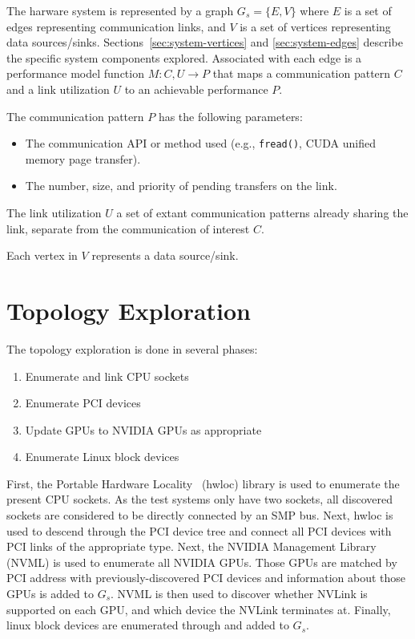 The harware system is represented by a graph $G_s = \{E,V\}$ where $E$ is a set of edges representing communication links, and $V$ is a set of vertices representing data sources/sinks.
Sections~\ref{sec:system-vertices} and \ref{sec:system-edges} describe the specific system components explored.
Associated with each edge is a performance model function $M: C,U \rightarrow P$ that maps a communication pattern $C$ and a link utilization $U$ to an achievable performance $P$.

The communication pattern $P$ has the following parameters:
\begin{itemize}
    \item The communication API or method used (e.g., \texttt{fread()}, CUDA unified memory page transfer).
    \item The number, size, and priority of pending transfers on the link.
\end{itemize}

The link utilization $U$ a set of extant communication patterns already sharing the link, separate from the communication of interest $C$.



Each vertex in $V$ represents a data source/sink.



%
%
\section{Topology Exploration}
\label{sec:topology-exploration}

The topology exploration is done in several phases:

\begin{minipage}[h]{\textwidth}
\begin{enumerate}
    \item Enumerate and link CPU sockets
    \item Enumerate PCI devices
    \item Update GPUs to NVIDIA GPUs as appropriate
    \item Enumerate Linux block devices
\end{enumerate}
\end{minipage}

First, the Portable Hardware Locality~\cite{broquedis2010hwloc} (hwloc) library is used to enumerate the present CPU sockets.
As the test systems only have two sockets, all discovered sockets are considered to be directly connected by an SMP bus.
Next, hwloc is used to descend through the PCI device tree and connect all PCI devices with PCI links of the appropriate type.
Next, the NVIDIA Management Library~\cite{nvidia2017nvml} (NVML) is used to enumerate all NVIDIA GPUs.
Those GPUs are matched by PCI address with previously-discovered PCI devices and information about those GPUs is added to $G_s$.
NVML is then used to discover whether NVLink is supported on each GPU, and which device the NVLink terminates at.
Finally, linux block devices are enumerated through  and added to $G_s$.

